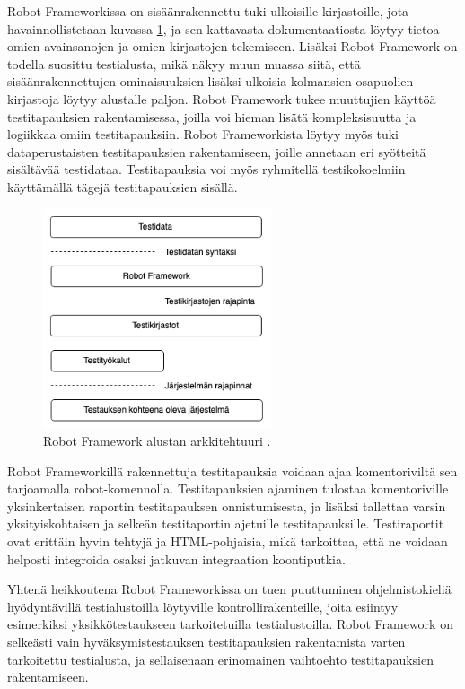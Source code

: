     Robot Frameworkissa on sisäänrakennettu tuki ulkoisille kirjastoille, jota havainnollistetaan kuvassa \ref{fig:robot-architecture}, ja sen kattavasta dokumentaatiosta löytyy tietoa omien avainsanojen ja omien kirjastojen tekemiseen.
    Lisäksi Robot Framework on todella suosittu testialusta, mikä näkyy muun muassa siitä, että sisäänrakennettujen ominaisuuksien lisäksi ulkoisia kolmansien osapuolien kirjastoja löytyy alustalle paljon.
    Robot Framework tukee muuttujien käyttöä testitapauksien rakentamisessa, joilla voi hieman lisätä kompleksisuutta ja logiikkaa omiin testitapauksiin.
    Robot Frameworkista löytyy myös tuki dataperustaisten testitapauksien rakentamiseen, joille annetaan eri syötteitä sisältävää testidataa.
    Testitapauksia voi myös ryhmitellä testikokoelmiin käyttämällä tägejä testitapauksien sisällä. \cite{robot_framework_user_guide}

    \begin{figure}[H]
      \centering
      \includegraphics[width=0.6\textwidth]{assets/robot-arkkitehtuuri.png}
      \caption{Robot Framework alustan arkkitehtuuri \cite{robot_framework_user_guide}.}
      \label{fig:robot-architecture}
    \end{figure}

    Robot Frameworkillä rakennettuja testitapauksia voidaan ajaa komentoriviltä sen tarjoamalla robot-komennolla.
    Testitapauksien ajaminen tulostaa komentoriville yksinkertaisen raportin testitapauksen onnistumisesta, ja lisäksi tallettaa varsin yksityiskohtaisen ja selkeän testitaportin ajetuille testitapauksille.
    Testiraportit ovat erittäin hyvin tehtyjä ja HTML-pohjaisia, mikä tarkoittaa, että ne voidaan helposti integroida osaksi jatkuvan integraation koontiputkia.

    Yhtenä heikkoutena Robot Frameworkissa on tuen puuttuminen ohjelmistokieliä hyödyntävillä testialustoilla löytyville kontrollirakenteille, joita esiintyy esimerkiksi yksikkötestaukseen tarkoitetuilla testialustoilla.
    Robot Framework on selkeästi vain hyväksymistestauksen testitapauksien rakentamista varten tarkoitettu testialusta, ja sellaisenaan erinomainen vaihtoehto testitapauksien rakentamiseen.

